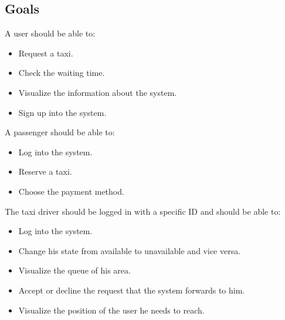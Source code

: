 \documentclass[18pt,oneside,a4paper, titlepage]{article}
\begin{document}
	\subsection{Goals}
	A user should be able to:
	\begin{itemize}
		\item Request a taxi.
		\item Check the waiting time.
		\item Visualize the information about the system.
		\item Sign up into the system.
	\end{itemize}
	A passenger should be able to:
	\begin{itemize}
		\item Log into the system.
		\item Reserve a taxi.
		\item Choose the payment method.
	\end{itemize}
	The taxi driver should be logged in with a specific ID and should be able to:
	\begin{itemize}
		\item Log into the system.
		\item Change his state from available to unavailable and vice versa.
		\item Visualize the queue of his area.
		\item Accept or decline the request that the system forwards to him.
		\item Visualize the position of the user he needs to reach.
	\end{itemize}
\end{document}

